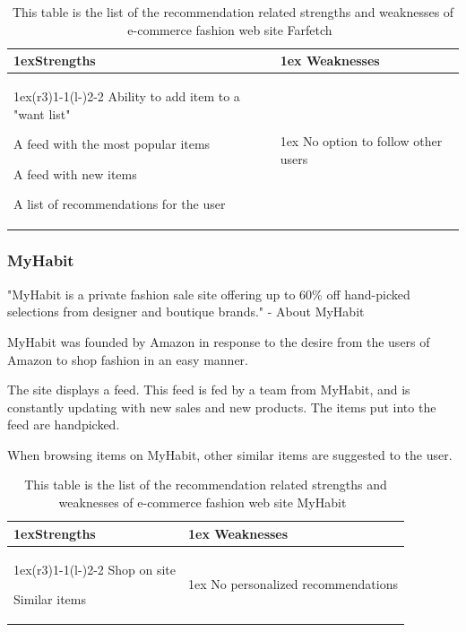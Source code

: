 \begin{table}[H]
    \centering
    \begin{tabularx}{\linewidth}{>{\parskip1ex}X@{\kern4\tabcolsep}>{\parskip1ex}X}
      \toprule
      \hfil\bfseries Strengths
      &
      \hfil\bfseries Weaknesses
        \\\cmidrule(r{3\tabcolsep}){1-1}\cmidrule(l{-\tabcolsep}){2-2}
            Ability to add item to a "want list" \par
            A feed with the most popular items \par
            A feed with new items \par
            A list of recommendations for the user \par
          &
            No option to follow other users \par
         \\\bottomrule
    \end{tabularx}
    \caption[Recommendation related strengths and weaknesses of Farfetch~\cite{Farfetch}]{This table is the list of the recommendation related strengths and weaknesses of e-commerce fashion web site Farfetch~\cite{Farfetch}}
    \label{table:ecommenreceFarfetch}
\end{table}

\subsubsection{MyHabit}
\label{par:myhabit}

"MyHabit is a private fashion sale site offering up to 60\% off hand-picked
selections from designer and boutique brands." - About MyHabit~\cite{MyHabit}

MyHabit was founded by Amazon in response to the desire from the users of
Amazon to shop fashion in an easy manner.

The site displays a feed.  This feed is fed by a team from MyHabit, and is
constantly updating with new sales and new products.  The items put into the
feed are handpicked.

When browsing items on MyHabit, other similar items are suggested to the user.

\begin{table}[H]
  \centering
  \begin{tabularx}{\linewidth}{>{\parskip1ex}X@{\kern4\tabcolsep}>{\parskip1ex}X}
    \toprule
    \hfil\bfseries Strengths & \hfil\bfseries Weaknesses \\
    \cmidrule(r{3\tabcolsep}){1-1}\cmidrule(l{-\tabcolsep}){2-2}
    Shop on site \par
    Similar items \par
    &
    No personalized recommendations \par \\
    \bottomrule
  \end{tabularx}
  \caption[Recommendation related strengths and weaknesses of MyHabit~\cite{MyHabit}]{This table is the list of the recommendation related strengths and weaknesses of e-commerce fashion web site MyHabit~\cite{MyHabit}}
  \label{table:ecommenreceMyHabit}
\end{table}

